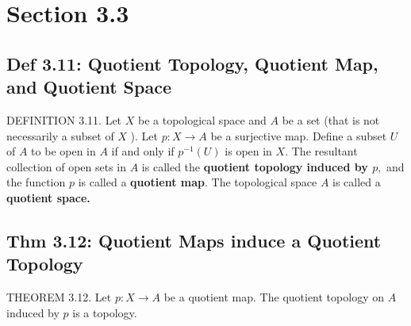 \documentclass[12pt]{article}
\newcommand{\df}[1]{\subsection*{Def #1}}
\newcommand{\thm}[1]{\subsection*{Thm #1}}
\begin{document}
	\section*{Section 3.3}
	\df{3.11: Quotient Topology, Quotient Map, and Quotient Space}
	DEFINITION 3.11. Let $ X $ be a topological space and $ A $ be a set (that is not necessarily a subset of $X$ ). Let $p: X \rightarrow A$ be a surjective map. Define a subset $ U $ of $ A $ to be open in $ A $ if and only if $p^{-1}(U)$ is open in $X .$ The resultant collection of open sets in $A$ is called the \textbf{quotient topology induced by $p,$ } and the function $ p $ is called a \textbf{quotient map}. The topological space $ A $ is called a \textbf{quotient space.}
	\thm{3.12: Quotient Maps induce a Quotient Topology}
	THEOREM 3.12. Let $p: X \rightarrow A$ be a quotient map. The quotient topology on $A$ induced by $p$ is a topology.
\end{document}

